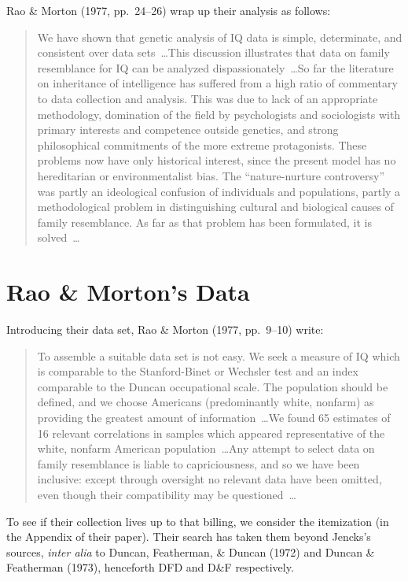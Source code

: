 ﻿\documentclass[12pt]{article}
\begin{document}
Rao \& Morton (1977, pp.\ 24--26) wrap up their analysis as follows:

\begin{quote}
We have shown that genetic analysis of IQ data is simple, determinate, and consistent over data sets~\ldots This discussion illustrates that data on family resemblance for IQ can be analyzed dispassionately~\ldots So far the literature on inheritance of intelligence has suffered from a high ratio of commentary to data collection and analysis. This was due to lack of an appropriate methodology, domination of the field by psychologists and sociologists with primary interests and competence outside genetics, and strong philosophical commitments of the more extreme protagonists. These problems now have only historical interest, since the present model has no hereditarian or environmentalist bias. The ``nature-nurture controversy'' was partly an ideological confusion of individuals and populations, partly a methodological problem in distinguishing cultural and biological causes of family resemblance. As far as that problem has been formulated, it is solved~\ldots
\end{quote}

\section{Rao \& Morton's Data}

Introducing their data set, Rao \& Morton (1977, pp.\ 9--10) write:

\begin{quote}
To assemble a suitable data set is not easy. We seek a measure of IQ which is comparable to the Stanford-Binet or Wechsler test and an index comparable to the Duncan occupational scale. The population should be defined, and we choose Americans (predominantly white, nonfarm) as providing the greatest amount of information~\ldots We found 65 estimates of 16 relevant correlations in samples which appeared representative of the white, nonfarm American population~\ldots Any attempt to select data on family resemblance is liable to capriciousness, and so we have been inclusive: except through oversight no relevant data have been omitted, even though their compatibility may be questioned~\ldots
\end{quote}

To see if their collection lives up to that billing, we consider the itemization (in the Appendix of their paper). Their search has taken them beyond Jencks's sources, \emph{inter alia} to Duncan, Featherman, \& Duncan (1972) and Duncan \& Featherman (1973), henceforth DFD and D\&F respectively.
\end{document}
